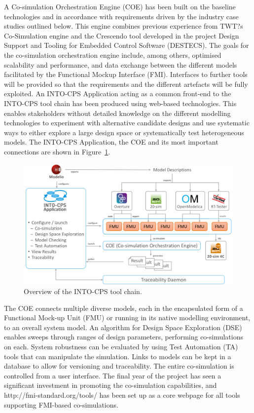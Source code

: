 A Co-simulation Orchestration Engine (COE) has been built on the baseline technologies and in accordance with requirements driven by the industry case studies outlined below. This engine combines previous experience from TWT?s Co-Simulation engine and the Crescendo tool developed in the project Design Support and Tooling for Embedded Control Software (DESTECS). The goals for the co-simulation orchestration engine include, among others, optimised scalability and performance, and data exchange between the different models facilitated by the Functional Mockup Interface (FMI). Interfaces to further tools will be provided so that the requirements and the different artefacts will be fully exploited. An INTO-CPS Application acting as a common front-end to the INTO-CPS tool chain has been produced using web-based technologies. This enables stakeholders without detailed knowledge on the different modelling technologies to experiment with alternative candidate designs and use systematic ways to either explore a large design space or systematically test heterogeneous models. The INTO-CPS Application, the COE and its most important connections are shown in Figure~\ref{fig:toolchain}. 
 
\begin{figure}[ht]
\centering
\includegraphics[width=\textwidth]{./figures/toolchain}
\caption{Overview of the INTO-CPS tool chain.}
\label{fig:toolchain}
\end{figure}

The COE connects multiple diverse models, each in the encapsulated form of a Functional Mock-up Unit (FMU) or running in its native modelling environment, to an overall system model. An algorithm for Design Space Exploration (DSE) enables sweeps through ranges of design parameters, performing co-simulations on each. System robustness can be evaluated by using Test Automation (TA) tools that can manipulate the simulation. Links to models can be kept in a database to allow for versioning and traceability. The entire co-simulation is controlled from a user interface. The final year of the project has seen a significant investment in promoting the co-simulation capabilities, and http://fmi-standard.org/tools/ has been set up as a core webpage for all tools supporting FMI-based co-simulations.

